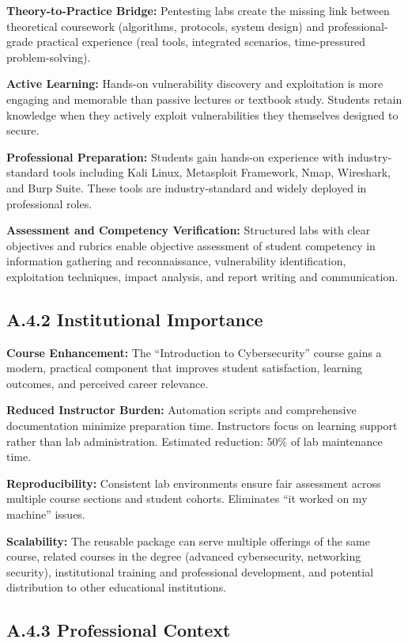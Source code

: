 \textbf{Theory-to-Practice Bridge:} Pentesting labs create the missing link between theoretical coursework (algorithms, protocols, system design) and professional-grade practical experience (real tools, integrated scenarios, time-pressured problem-solving).

\textbf{Active Learning:} Hands-on vulnerability discovery and exploitation is more engaging and memorable than passive lectures or textbook study. Students retain knowledge when they actively exploit vulnerabilities they themselves designed to secure.

\textbf{Professional Preparation:} Students gain hands-on experience with industry-standard tools including Kali Linux, Metasploit Framework, Nmap, Wireshark, and Burp Suite. These tools are industry-standard and widely deployed in professional roles.

\textbf{Assessment and Competency Verification:} Structured labs with clear objectives and rubrics enable objective assessment of student competency in information gathering and reconnaissance, vulnerability identification, exploitation techniques, impact analysis, and report writing and communication.


\subsection*{A.4.2 Institutional Importance}


\textbf{Course Enhancement:} The ``Introduction to Cybersecurity'' course gains a modern, practical component that improves student satisfaction, learning outcomes, and perceived career relevance.

\textbf{Reduced Instructor Burden:} Automation scripts and comprehensive documentation minimize preparation time. Instructors focus on learning support rather than lab administration. Estimated reduction: 50\% of lab maintenance time.

\textbf{Reproducibility:} Consistent lab environments ensure fair assessment across multiple course sections and student cohorts. Eliminates ``it worked on my machine'' issues.

\textbf{Scalability:} The reusable package can serve multiple offerings of the same course, related courses in the degree (advanced cybersecurity, networking security), institutional training and professional development, and potential distribution to other educational institutions.


\subsection*{A.4.3 Professional Context}


